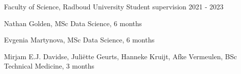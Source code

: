 \begin{cventries}
  \cventry
    {Faculty of Science, Radboud University} %
    {Student supervision} %
    {} %
    {2021 - 2023} %
    {
      \begin{cvitems} %
        \item {Nathan Golden, MSc Data Science, 6 months}
        \item {Evgenia Martynova, MSc Data Science, 6 months}
        \item {Mirjam E.J. Davidse, Juliëtte Geurts, Hanneke Kruijt, Afke Vermeulen, BSc Technical Medicine, 3 months}
      \end{cvitems}
    }

\end{cventries}
